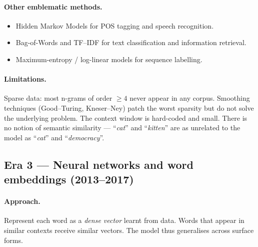 \documentclass[12pt,a4paper]{report}
\theoremstyle{definition}
\theoremstyle{remark}
\begin{document}
\paragraph{Other emblematic methods.}
\begin{itemize}
    \item Hidden Markov Models for POS tagging and speech recognition.
    \item Bag-of-Words and TF--IDF for text classification and information retrieval.
    \item Maximum-entropy / log-linear models for sequence labelling.
\end{itemize}

\paragraph{Limitations.} Sparse data: most n-grams of order $\geq 4$ never appear in any corpus. Smoothing techniques (Good--Turing, Kneser--Ney) patch the worst sparsity but do not solve the underlying problem. The context window is hard-coded and small. There is no notion of semantic similarity --- ``\emph{cat}'' and ``\emph{kitten}'' are as unrelated to the model as ``\emph{cat}'' and ``\emph{democracy}''.

\subsection{Era 3 --- Neural networks and word embeddings (2013--2017)}

\paragraph{Approach.} Represent each word as a \emph{dense vector} learnt from data. Words that appear in similar contexts receive similar vectors. The model thus generalises across surface forms.
\end{document}
